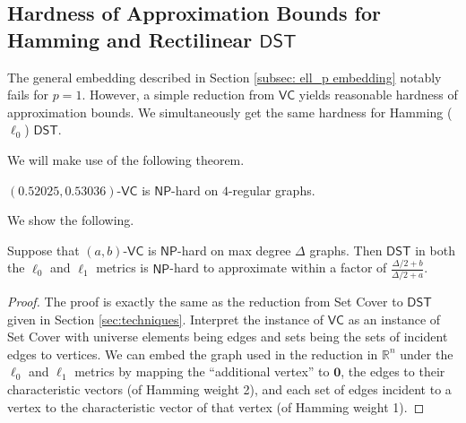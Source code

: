 \documentclass{theoretics}
\newcommand{\R}{\mathbb{R}}
\newcommand{\1}{\textbf{1}}
\newcommand{\dst}{$\mathsf{DST}$\xspace}
\newcommand{\np}{$\mathsf{NP}$\xspace}
\newcommand{\vcov}{$\mathsf{VC}$\xspace}
\begin{document}
\subsection{Hardness of Approximation Bounds for Hamming and Rectilinear \texorpdfstring{\dst}{DST}}
The general embedding described in Section \ref{subsec: ell_p embedding} notably fails for $p = 1$. However, a simple reduction from \vcov yields reasonable hardness of approximation bounds. We simultaneously get the same hardness for Hamming ($\ell_0$) \dst. 

We will make use of the following theorem.

\begin{theorem}  \label{thm: vcov hard}
$(0.52025, 0.53036)$-\vcov is \np-hard on $4$-regular graphs.
\end{theorem}


We show the following.

\begin{theorem} \label{thm: vx cover corr}
Suppose that $(a, b)$-\vcov is \np-hard on max degree $\Delta$ graphs. Then  \dst in both the $\ell_0$ and $\ell_1$ metrics is \np-hard to approximate within a factor of
$\frac{\Delta/2 + b}{\Delta/2 + a}$.
\end{theorem}
\begin{proof}
The proof is exactly the same as the reduction from Set Cover to \dst given in Section \ref{sec:techniques}. Interpret the instance of \vcov as an instance of Set Cover with universe elements being edges and sets being the sets of incident edges to vertices. We can embed the graph used in the reduction in $\R^n$ under the $\ell_0$ and $\ell_1$ metrics by mapping the ``additional vertex'' to $\mathbf{0}$, the edges to their characteristic vectors (of Hamming weight 2), and each set of edges incident to a vertex to the characteristic vector of that vertex (of Hamming weight 1).
\end{proof}
\end{document}
